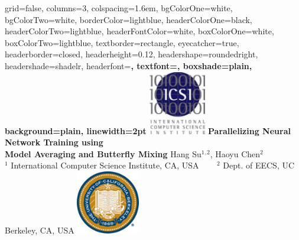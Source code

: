 \documentclass[landscape,final,archE1,fontscale=0.3]{baposter}
\begin{document}


\begin{poster}%
  {
  grid=false,
  columns=3,
  colspacing=1.6em,
  bgColorOne=white,
  bgColorTwo=white,
  borderColor=lightblue,
  headerColorOne=black,
  headerColorTwo=lightblue,
  headerFontColor=white,
  boxColorOne=white,
  boxColorTwo=lightblue,
  textborder=rectangle,
  eyecatcher=true,
  headerborder=closed,
  headerheight=0.12\textheight,
  headershape=roundedright,
  headershade=shadelr,
  headerfont=\Large\bf, %
  textfont={\setlength{\parindent}{1.5em}},
  boxshade=plain,
  background=plain,
  linewidth=2pt
  }
  {\includegraphics[height=7.5em]{images/ICSI_color}}
  {\bf{Parallelizing Neural Network Training using \\Model Averaging and Butterfly Mixing}}
  {Hang Su$^1$$^,$$^2$, Haoyu Chen$^2$\\
  $^1$ International Computer Science Institute, CA, USA ~~~ $^2$ Dept. of EECS, UC Berkeley, CA, USA }
  {%
    \includegraphics[height=7.5em]{images/ucbseal}
  }


\end{poster}
\end{document}
